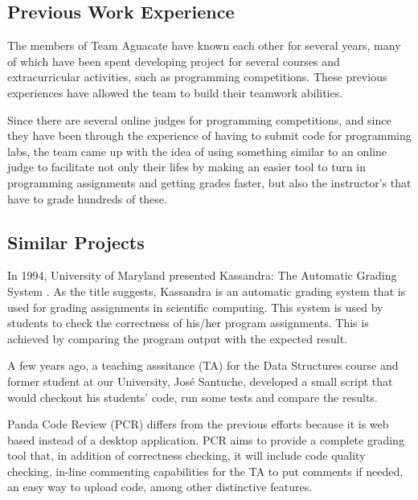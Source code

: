 
\subsection{Previous Work Experience}
The members of Team Aguacate have known each other for several years, many of which have been spent developing project for several courses and extracurricular activities, such as programming competitions.  These previous experiences have allowed the team to build their teamwork abilities.

Since there are several online judges for programming competitions, and since they have been through the experience of having to submit code for programming labs, the team came up with the idea of using something similar to an online judge to facilitate not only their lifes by making an easier tool to turn in programming assignments and getting grades faster, but also the instructor's that have to grade hundreds of these.

\subsection{Similar Projects}

In 1994, University of Maryland presented Kassandra: The Automatic Grading System \cite{Matt1994}.  As the title suggests, Kassandra is an automatic grading system that is used for grading assignments in scientific computing.  This system is used by students to check the correctness of his/her program assignments.  This is achieved by comparing the program output with the expected result.

A few years ago, a teaching asssitance (TA) for the Data Structures course and former student at our University, José Santuche, developed a small script that would checkout his students' code, run some tests and compare the results.

Panda Code Review (PCR) differs from the previous efforts because it is web based instead of a desktop application. PCR aims to provide a complete grading tool that, in addition of correctness checking, it will include code quality checking, in-line commenting capabilities for the TA to put comments if needed, an easy way to upload code, among other distinctive features.